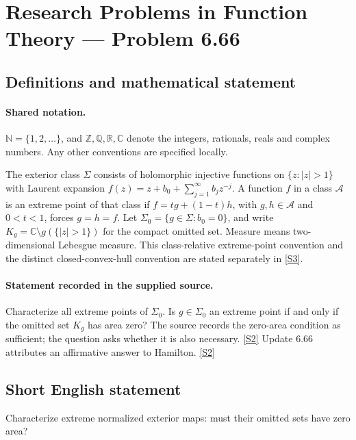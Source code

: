 \documentclass[11pt]{article}
\newcommand{\sref}[2]{\hyperlink{source:#1:#2}{[S#2]}}
\begin{document}
\section{Research Problems in Function Theory — Problem 6.66}\label{statement}

\subsection{Definitions and mathematical statement}

\paragraph{Shared notation.}$\mathbb N=\{1,2,\ldots\}$, and $\mathbb Z,\mathbb Q,\mathbb R,\mathbb C$ denote the integers, rationals, reals and complex numbers. Any other conventions are specified locally.


The exterior class $\Sigma$ consists of holomorphic injective functions on $\{z:|z|>1\}$ with Laurent expansion $f(z)=z+b_0+\sum_{j=1}^{\infty}b_jz^{-j}$. A function $f$ in a class $\mathcal A$ is an extreme point of that class if $f=tg+(1-t)h$, with $g,h\in\mathcal A$ and $0<t<1$, forces $g=h=f$. Let $\Sigma_0=\{g\in\Sigma:b_0=0\}$, and write $K_g=\mathbb C\setminus g(\{|z|>1\})$ for the compact omitted set. Measure means two-dimensional Lebesgue measure. This class-relative extreme-point convention and the distinct closed-convex-hull convention are stated separately in \sref{statement}{3}.
\paragraph{Statement recorded in the supplied source.}
Characterize all extreme points of $\Sigma_0$. Is $g\in\Sigma_0$ an extreme point if and only if the omitted set $K_g$ has area zero? The source records the zero-area condition as sufficient; the question asks whether it is also necessary. \sref{statement}{2}
Update 6.66 attributes an affirmative answer to Hamilton. \sref{statement}{2}
\subsection{Short English statement}
Characterize extreme normalized exterior maps: must their omitted sets have zero area?
\end{document}

